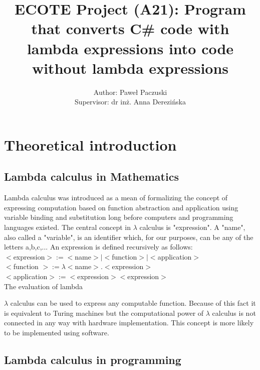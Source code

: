\documentclass[]{report}
\title{ECOTE Project (A21):  Program that converts C\# code with lambda expressions into code without lambda expressions}
\author{Author: Paweł Paczuski \\ Supervisor: dr inż. Anna Derezińska}
\begin{document}
    \maketitle
    
    \tableofcontents
    \pagebreak
    
    \chapter{Theoretical introduction}
    \section{Lambda calculus in Mathematics}
    Lambda calculus was introduced as a mean of formalizing the concept of expressing computation based on function abstraction and application using variable binding and substitution long before computers and programming languages existed. \cite{lambddef}
    The central concept in $\lambda$ calculus is "expression". A  "name",  also  called a "variable", is an identifier which, for our purposes, can be any of the letters
    a,b,c,...
    An expression is defined recursively as follows\cite{lambdintro}:\\
    $<$expression$>:=< $name$ >|< $function$ >|< $application$ > $ \\
    $<$function $>:= \lambda < $name$ >.< $expression$ > $\\
    $<$application$>:=<$expression$ >< $expression$ > $\\
    
    The evaluation of lambda
    
    $\lambda$  calculus can be used to express any computable function. Because of this fact it is equivalent to Turing machines but the computational power of $\lambda$ calculus is not connected in any way with hardware implementation. This concept is more likely to be implemented using software.
    
    \section{Lambda calculus in programming}
    
\end{document}
